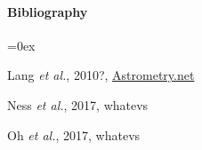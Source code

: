 \documentclass[12pt,letterpaper]{article}
\newcommand{\foreign}[1]{\textsl{#1}}
\newcommand{\etal}{\foreign{et al.}}
\begin{document}
\paragraph{Bibliography}
\begin{trivlist}\itemsep=0ex
\item Lang \etal, 2010?, \url{Astrometry.net}
\item Ness \etal, 2017, whatevs
\item Oh \etal, 2017, whatevs
\end{trivlist}
\end{document}
